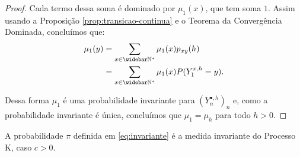 \begin{proof}
  Cada termo dessa soma é dominado por $\mu_1(x)$, que tem soma $1$.
  Assim usando a Proposição \ref{prop:transicao-continua} e o Teorema da
  Convergência Dominada, concluímos que:
  \begin{align*}
    \mu_1 (y) &= \sum_{x \in \Nzb} \mu_1(x) p_{x y} (h)\\
    &= \sum_{x \in \Nzb} \mu_1(x) P(Y_1^{x, h} = y).
  \end{align*}

  Dessa forma $\mu_1$ é uma probabilidade invariante para
  $(Y_n^{\bullet, h})_n $ e, como a probabilidade invariante é única,
  concluímos que $\mu_1 = \mu_h$ para todo $h > 0$.
\end{proof}


\begin{proposicao}
  A probabilidade $\pi$ definida em \eqref{eq:invariante} é a medida
  invariante do Processo K, caso $c > 0$.
\end{proposicao}
